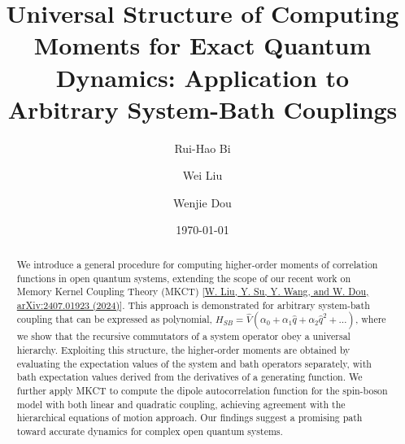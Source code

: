 \documentclass[preprint,aip,jcp]{revtex4-2}
\begin{document}
\title{Universal Structure of Computing Moments for Exact Quantum Dynamics: Application to Arbitrary System-Bath Couplings}
\author{Rui-Hao Bi}

\author{Wei Liu}

\author{Wenjie Dou}%

\date{\today}

\begin{abstract}
    We introduce a general procedure for computing higher-order moments of correlation functions in open quantum systems, extending the scope of our recent work on Memory Kernel Coupling Theory (MKCT) [\href{https://arxiv.org/abs/2407.01923}{W. Liu, Y. Su, Y. Wang, and W. Dou, arXiv:2407.01923 (2024)}]. This approach is demonstrated for arbitrary system-bath coupling that can be expressed as polynomial, $H_{SB} = \hat{V} (\alpha_0 + \alpha_1 \hat{q} + \alpha_2 \hat{q}^2+ \dots)$, where we show that the recursive commutators of a system operator obey a universal hierarchy. Exploiting this structure, the higher-order moments are obtained by evaluating the expectation values of the system and bath operators separately, with bath expectation values derived from the derivatives of a generating function. We further apply MKCT to compute the dipole autocorrelation function for the spin-boson model with both linear and quadratic coupling, achieving agreement with the hierarchical equations of motion approach. Our findings suggest a promising path toward accurate dynamics for complex open quantum systems. 
\end{abstract}

\maketitle
\end{document}
